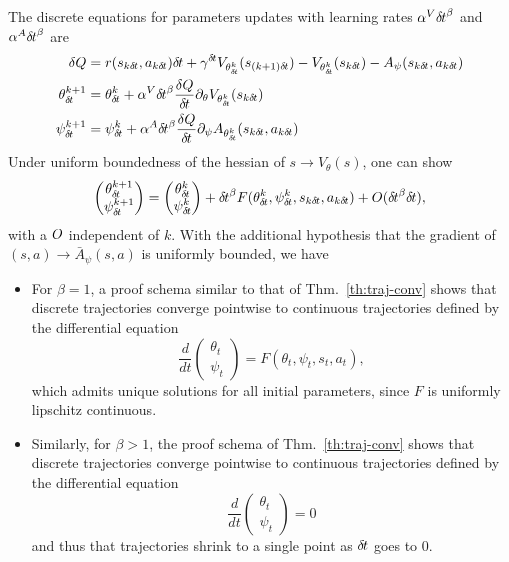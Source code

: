 The discrete equations for parameters updates with learning rates $\alpha^V {\delta\hspace{-.1em}t}^\beta$ and
$\alpha^A {\delta\hspace{-.1em}t}^\beta$ are
\begin{align}
	\delta Q &= r(s_{k \deltat}, a_{k \deltat}) \deltat + 
		\gamma^\deltat V_{\theta^{k}_\deltat}(s_{(k + 1)\deltat}) - 
		V_{\theta^k_\deltat}(s_{k\deltat}) - A_\psi(s_{k \deltat}, a_{k \deltat})\\
	\theta^{k+1}_\deltat &= \theta^k_\deltat + 
	\alpha^V \deltat^\beta \frac{\delta Q
	}{\deltat}\partial_\theta V_{\theta^k_\deltat}(s_{k\deltat})\\
	\psi^{k+1}_\deltat &= \psi^k_\deltat + 
	\alpha^A \deltat^\beta \frac{\delta Q
	}{\deltat}
	\partial_\psi A_{\theta^k_\deltat}(s_{k\deltat}, a_{k\deltat})
\end{align}
Under uniform boundedness of the hessian of $s \rightarrow V_\theta(s)$,
one can show
\begin{equation}
	\begin{pmatrix}
		\theta_{\delta\hspace{-.1em}t}^{k+1} \\
		\psi_{\delta\hspace{-.1em}t}^{k+1}
	\end{pmatrix} =
	\begin{pmatrix}
		\theta_{\delta\hspace{-.1em}t}^{k} \\
		\psi_{\delta\hspace{-.1em}t}^{k}
	\end{pmatrix} + {\delta\hspace{-.1em}t}^\beta F(\theta_{\delta\hspace{-.1em}t}^k, \psi_{\delta\hspace{-.1em}t}^k, s_{k {\delta\hspace{-.1em}t}}, a_{k{\delta\hspace{-.1em}t}}) + O({\delta\hspace{-.1em}t}^\beta {\delta\hspace{-.1em}t}),
\end{equation}
with a $O$ independent of $k$. With the additional hypothesis that the gradient of
$(s, a) \rightarrow \bar{A}_\psi(s, a)$ is uniformly bounded, we have
\begin{itemize}
	\item For $\beta = 1$, a proof schema similar to that of Thm.~\ref{th:traj-conv} shows that
discrete trajectories converge pointwise to continuous trajectories defined by the differential equation
\begin{equation}
	\frac{d}{dt}\begin{pmatrix}
		\theta_t \\
		\psi_t
	\end{pmatrix} =
	F(\theta_t, \psi_t, s_t, a_t),
\end{equation}
which admits unique solutions for all initial parameters, since $F$ is uniformly lipschitz continuous.
\item Similarly, for $\beta > 1$, the proof schema of Thm.~\ref{th:traj-conv} shows that
discrete trajectories converge pointwise to continuous trajectories defined by the differential equation
\begin{equation}
	\frac{d}{dt}\begin{pmatrix}
		\theta_t \\
		\psi_t
	\end{pmatrix} = 0
\end{equation}
and thus that trajectories shrink to a single point as ${\delta\hspace{-.1em}t}$ goes to $0$.
\end{itemize}
